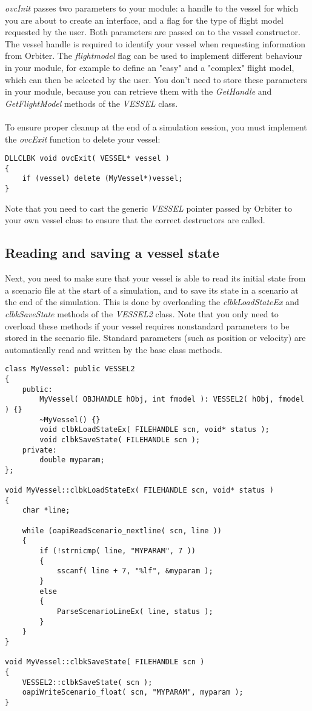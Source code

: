 \documentclass[Orbiter Developer Manual.tex]{subfiles}
\begin{document}
\noindent
\textit{ovcInit} passes two parameters to your module: a handle to the vessel for which you are about to create an interface, and a flag for the type of flight model requested by the user. Both parameters are passed on to the vessel constructor. The vessel handle is required to identify your vessel when requesting information from Orbiter. The \textit{flightmodel} flag can be used to implement different behaviour in your module, for example to define an "easy" and a "complex" flight model, which can then be selected by the user. You don't need to store these parameters in your module, because you can retrieve them with the \textit{GetHandle} and \textit{GetFlightModel} methods of the \textit{VESSEL} class.\\
\\
To ensure proper cleanup at the end of a simulation session, you must implement the \textit{ovcExit} function to delete your vessel:

\begin{lstlisting}
DLLCLBK void ovcExit( VESSEL* vessel )
{
	if (vessel) delete (MyVessel*)vessel;
}
\end{lstlisting}

\noindent
Note that you need to cast the generic \textit{VESSEL} pointer passed by Orbiter to your own vessel class to ensure that the correct destructors are called.


\subsection{Reading and saving a vessel state}
Next, you need to make sure that your vessel is able to read its initial state from a scenario file at the start of a simulation, and to save its state in a scenario at the end of the simulation. This is done by overloading the \textit{clbkLoadStateEx} and \textit{clbkSaveState} methods of the \textit{VESSEL2} class. Note that you only need to overload these methods if your vessel requires nonstandard parameters to be stored in the scenario file. Standard parameters (such as position or velocity) are automatically read and written by the base class methods.

\begin{lstlisting}
class MyVessel: public VESSEL2
{
	public:
		MyVessel( OBJHANDLE hObj, int fmodel ): VESSEL2( hObj, fmodel ) {}
		~MyVessel() {}
		void clbkLoadStateEx( FILEHANDLE scn, void* status );
		void clbkSaveState( FILEHANDLE scn );
	private:
		double myparam;
};

void MyVessel::clbkLoadStateEx( FILEHANDLE scn, void* status )
{
	char *line;

	while (oapiReadScenario_nextline( scn, line ))
	{
		if (!strnicmp( line, "MYPARAM", 7 ))
		{
			sscanf( line + 7, "%lf", &myparam );
		}
		else
		{
			ParseScenarioLineEx( line, status );
		}
	}
}

void MyVessel::clbkSaveState( FILEHANDLE scn )
{
	VESSEL2::clbkSaveState( scn );
	oapiWriteScenario_float( scn, "MYPARAM", myparam );
}
\end{lstlisting}
\end{document}
